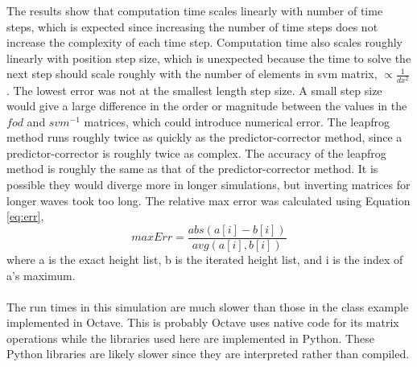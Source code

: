 \documentclass[a4paper,12pt]{article}
\begin{document}
		The results show that computation time scales linearly with number of time steps, which is expected since increasing the number of time steps does not increase the complexity of each time step.  Computation time also scales roughly linearly with position step size, which is unexpected because the time to solve the next step should scale roughly with the number of elements in svm matrix, $\propto \frac{1}{dx^{2}}$.  The lowest error was not at the smallest length step size.  A small step size would give a large difference in the order or magnitude between the values in the $fod$ and $svm^{-1}$ matrices, which could introduce numerical error.  The leapfrog method runs roughly twice as quickly as the predictor-corrector method, since a predictor-corrector is roughly twice as complex.  The accuracy of the leapfrog method is roughly the same as that of the predictor-corrector method.  It is possible they would diverge more in longer simulations, but inverting matrices for longer waves took too long.  The relative max error was calculated using Equation \ref{eq:err},
		\begin{equation}
			\label{eq:err}
			maxErr = \frac{abs(a[i] - b[i])}{avg(a[i], b[i])}
		\end{equation}
		where a is the exact height list, b is the iterated height list, and i is the index of a's maximum.
	\paragraph*{}
		The run times in this simulation are much slower than those in the class example implemented in Octave.  This is probably Octave uses native code for its matrix operations while the libraries used here are implemented in Python.  These Python libraries are likely slower since they are interpreted rather than compiled.  
\end{document}
